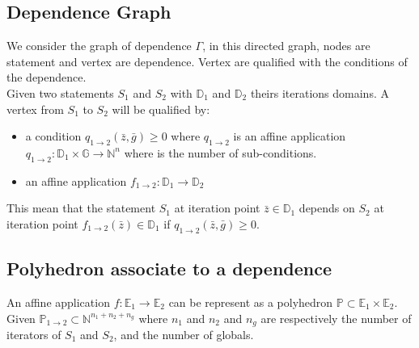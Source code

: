 		\subsection{Dependence Graph}

We consider the graph of dependence $\Gamma$, in this directed graph, nodes are statement and vertex are dependence.
Vertex are qualified with the conditions of the dependence.\\
Given two statements $S_{1}$ and $S_{2}$ with $\mathbb{D}_{1}$ and $\mathbb{D}_{2}$ theirs iterations domains.
A vertex from $S_{1}$ to $S_{2}$ will be qualified by:
\begin{itemize}
	\item a condition $q_{1 \rightarrow 2}(\bar{z}, \bar{g}) \geq 0$ where $q_{1 \rightarrow 2}$ is an affine application
		$q_{1 \rightarrow 2}: \mathbb{D}_{1} \times \mathbb{G} \rightarrow \mathbb{N}^{n}$ where is the number of
		sub-conditions.
	\item an affine application $f_{1 \rightarrow 2} : \mathbb{D}_{1} \rightarrow \mathbb{D}_{2}$
\end{itemize}
This mean that the statement $S_{1}$ at iteration point $\bar{z} \in \mathbb{D}_{1}$ depends on $S_{2}$ at iteration point
$f_{1 \rightarrow 2}(\bar{z}) \in \mathbb{D}_{1}$ if $q_{1 \rightarrow 2}(\bar{z}, \bar{g}) \geq 0$.\\

		\subsection{Polyhedron associate to a dependence}

An affine application $f: \mathbb{E}_{1} \rightarrow \mathbb{E}_{2}$ can be represent as a polyhedron
$\mathbb{P} \subset \mathbb{E}_{1} \times \mathbb{E}_{2}$.\\
Given $\mathbb{P}_{1 \rightarrow 2} \subset \mathbb{N}^{n_{1} + n_{2} + n_{g}}$ where $n_{1}$ and $n_{2}$ and $n_{g}$ are
respectively the number of iterators of $S_{1}$ and $S_{2}$, and the number of globals.\\

